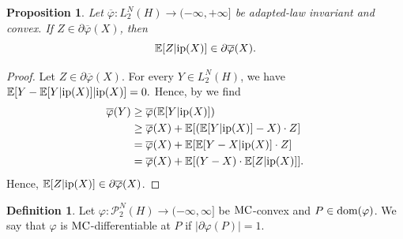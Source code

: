 \documentclass[a4paper]{amsart}
\numberwithin{theorem}{section}
\newtheorem{proposition}[theorem]{Proposition}
\theoremstyle{definition}
\newtheorem{definition}[theorem]{Definition}
\newcommand{\E}{\mathbb{E}}
\newcommand{\dom}{\textup{dom}}
\newcommand{\Pc}{\mathcal P}
\renewcommand{\H}{H}
\renewcommand{\phi}{\varphi}
\newcommand{\MC}{\textup{MC}}
\newcommand{\ip}{\textup{ip}}
\begin{document}
\begin{proposition}\label{prop:sub_grad_proj_ad}
Let $\overline{\phi} : L_2^N(\H) \to (-\infty, +\infty]$ be adapted-law invariant and convex. If $Z \in \partial \overline{\phi}(X)$, then 
\[
\E[Z |  \ip(X) ] \in \partial \overline{\phi}(X). 
\]
\end{proposition}
\begin{proof} Let $Z \in \partial \overline{\phi}(X)$. For every $Y \in L_2^N(\H)$, we have 
$
\E[ Y -    \E[ Y | \ip(X)] |  \ip(X) ] =0.
$
Hence, by  we find
    \begin{align*}
        \overline{\phi}(Y) &\ge \overline{\phi}(  \E[ Y | \ip(X) ])  \\
        & \ge \overline{\phi}(X) + \E [    (\E[ Y |  \ip(X) ] - X)  \cdot Z   ]  \\
        &= \overline{\phi}(X) + \E [   \E[ Y - X | \ip(X)]   \cdot Z   ] \\
        &= \overline{\phi}(X) + \E [ (Y-X) \cdot \E[ Z | \ip(X)]].
    \end{align*}
    Hence, $\E[ Z |\ip(X)] \in \partial\overline{\phi}(X)$. 
\end{proof}




\begin{definition}\label{def:MCdiff_ad}
    Let $\phi:\Pc_2^N(\H)\to (-\infty, \infty]$ be $\MC$-convex and $P\in \dom(\phi)$. We say that $\phi $ is $\MC$-differentiable at $P$ if $|\partial \phi(P)|=1$.
\end{definition}
\end{document}
